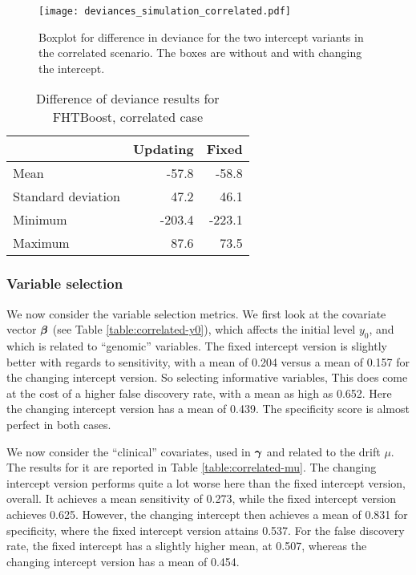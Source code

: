 \begin{figure}
\caption{Boxplot for difference in deviance for the two intercept variants in the correlated scenario.
The boxes are without and with changing the intercept.}
\label{fig:simulation-correlated-deviances-boxplot}
\centering\texttt{[image: deviances\_simulation\_correlated.pdf]}
\end{figure}


\begin{table}
\caption{Difference of deviance results for FHTBoost, correlated case}
\label{table:uncorrelated-deviance}
\centering
\begin{tabular}{l|rr}
\toprule
& Updating & Fixed \\
\hline
Mean               &  -57.8  &  -58.8  \\
Standard deviation &   47.2  &   46.1  \\
Minimum            & -203.4  & -223.1  \\
Maximum            &   87.6  &   73.5  \\
\bottomrule
\end{tabular}
\end{table}


\subsubsection{Variable selection}
We now consider the variable selection metrics.
We first look at the covariate vector $\boldsymbol{\beta}$ (see Table \ref{table:correlated-y0}), which affects the initial level $y_0$, and which is related to ``genomic'' variables.
The fixed intercept version is slightly better with regards to sensitivity, with a mean of 0.204 versus a mean of 0.157 for the changing intercept version.
So selecting informative variables,
This does come at the cost of a higher false discovery rate, with a mean as high as 0.652.
Here the changing intercept version has a mean of 0.439.
The specificity score is almost perfect in both cases.

We now consider the ``clinical'' covariates, used in $\boldsymbol{\gamma}$ and related to the drift $\mu$.
The results for it are reported in Table \ref{table:correlated-mu}.
The changing intercept version performs quite a lot worse here than the fixed intercept version, overall.
It achieves a mean sensitivity of 0.273, while the fixed intercept version achieves 0.625.
However, the changing intercept then achieves a mean of 0.831 for specificity, where the fixed intercept version attains 0.537.
For the false discovery rate, the fixed intercept has a slightly higher mean, at 0.507, whereas the changing intercept version has a mean of 0.454.


